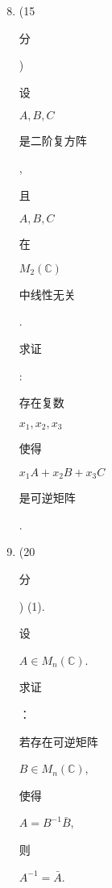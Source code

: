 \documentclass[10pt]{article}
\begin{document}
\begin{enumerate}
  \setcounter{enumi}{7}
  \item (15 \begin{CJK}{UTF8}{mj}分\end{CJK}) \begin{CJK}{UTF8}{mj}设\end{CJK} $A, B, C$ \begin{CJK}{UTF8}{mj}是二阶复方阵\end{CJK}, \begin{CJK}{UTF8}{mj}且\end{CJK} $A, B, C$ \begin{CJK}{UTF8}{mj}在\end{CJK} $M_{2}(\mathbb{C})$ \begin{CJK}{UTF8}{mj}中线性无关\end{CJK}. \begin{CJK}{UTF8}{mj}求证\end{CJK}: \begin{CJK}{UTF8}{mj}存在复数\end{CJK} $x_{1}, x_{2}, x_{3}$ \begin{CJK}{UTF8}{mj}使得\end{CJK} $x_{1} A+x_{2} B+x_{3} C$ \begin{CJK}{UTF8}{mj}是可逆矩阵\end{CJK}.

  \item (20 \begin{CJK}{UTF8}{mj}分\end{CJK}) (1). \begin{CJK}{UTF8}{mj}设\end{CJK} $A \in M_{n}(\mathbb{C})$. \begin{CJK}{UTF8}{mj}求证\end{CJK}：\begin{CJK}{UTF8}{mj}若存在可逆矩阵\end{CJK} $B \in M_{n}(\mathbb{C})$, \begin{CJK}{UTF8}{mj}使得\end{CJK} $A=B^{-1} \bar{B}$, \begin{CJK}{UTF8}{mj}则\end{CJK} $A^{-1}=\bar{A}$.

\end{enumerate}
\end{document}
